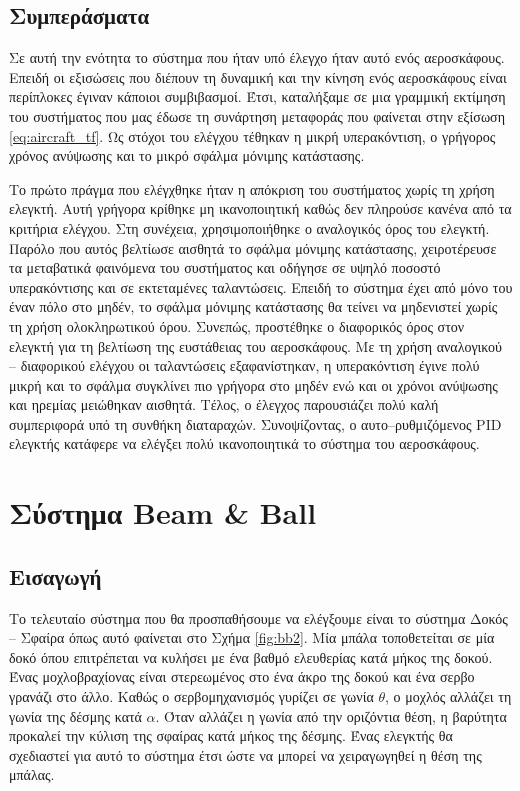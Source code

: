 \subsection{Συμπεράσματα}

Σε αυτή την ενότητα το σύστημα που ήταν υπό έλεγχο ήταν αυτό ενός αεροσκάφους. Επειδή οι εξισώσεις που διέπουν τη δυναμική και την κίνηση ενός αεροσκάφους είναι περίπλοκες έγιναν κάποιοι συμβιβασμοί. Έτσι, καταλήξαμε σε μια γραμμική εκτίμηση του συστήματος που μας έδωσε τη συνάρτηση μεταφοράς που φαίνεται στην εξίσωση \ref{eq:aircraft_tf}. Ως στόχοι του ελέγχου τέθηκαν η μικρή υπερακόντιση, ο γρήγορος χρόνος ανύψωσης και το μικρό σφάλμα μόνιμης κατάστασης.

Το πρώτο πράγμα που ελέγχθηκε ήταν η απόκριση του συστήματος χωρίς τη χρήση ελεγκτή. Αυτή γρήγορα κρίθηκε μη ικανοποιητική καθώς δεν πληρούσε κανένα από τα κριτήρια ελέγχου. Στη συνέχεια, χρησιμοποιήθηκε ο αναλογικός όρος του ελεγκτή. Παρόλο που αυτός βελτίωσε αισθητά το σφάλμα μόνιμης κατάστασης, χειροτέρευσε τα μεταβατικά φαινόμενα του συστήματος και οδήγησε σε υψηλό ποσοστό υπερακόντισης και σε εκτεταμένες ταλαντώσεις. Επειδή το σύστημα έχει από μόνο του έναν πόλο στο μηδέν, το σφάλμα μόνιμης κατάστασης θα τείνει να μηδενιστεί χωρίς τη χρήση ολοκληρωτικού όρου. Συνεπώς, προστέθηκε ο διαφορικός όρος στον ελεγκτή για τη βελτίωση της ευστάθειας του αεροσκάφους. Με τη χρήση αναλογικού -- διαφορικού ελέγχου οι ταλαντώσεις εξαφανίστηκαν, η υπερακόντιση έγινε πολύ μικρή και το σφάλμα συγκλίνει πιο γρήγορα στο μηδέν ενώ και οι χρόνοι ανύψωσης και ηρεμίας μειώθηκαν αισθητά. Τέλος, ο έλεγχος παρουσιάζει πολύ καλή συμπεριφορά υπό τη συνθήκη διαταραχών. Συνοψίζοντας, ο αυτο--ρυθμιζόμενος PID ελεγκτής κατάφερε να ελέγξει πολύ ικανοποιητικά το σύστημα του αεροσκάφους.\newpage

\section{Σύστημα Beam \& Ball} \label{sec:ball_beam}

\subsection{Εισαγωγή}

Το τελευταίο σύστημα που θα προσπαθήσουμε να ελέγξουμε είναι το σύστημα Δοκός -- Σφαίρα όπως αυτό φαίνεται στο Σχήμα \ref{fig:bb2}. Μία μπάλα τοποθετείται σε μία δοκό όπου επιτρέπεται να κυλήσει με ένα βαθμό ελευθερίας κατά μήκος της δοκού. Ένας μοχλοβραχίονας είναι στερεωμένος στο ένα άκρο της δοκού και ένα σερβο γρανάζι στο άλλο. Καθώς ο σερβομηχανισμός γυρίζει σε γωνία $\theta$, ο μοχλός αλλάζει τη γωνία της δέσμης κατά $\alpha$. Όταν αλλάζει η γωνία από την οριζόντια θέση, η βαρύτητα προκαλεί την κύλιση της σφαίρας κατά μήκος της δέσμης. Ένας ελεγκτής θα σχεδιαστεί για αυτό το σύστημα έτσι ώστε να μπορεί να χειραγωγηθεί η θέση της μπάλας.

